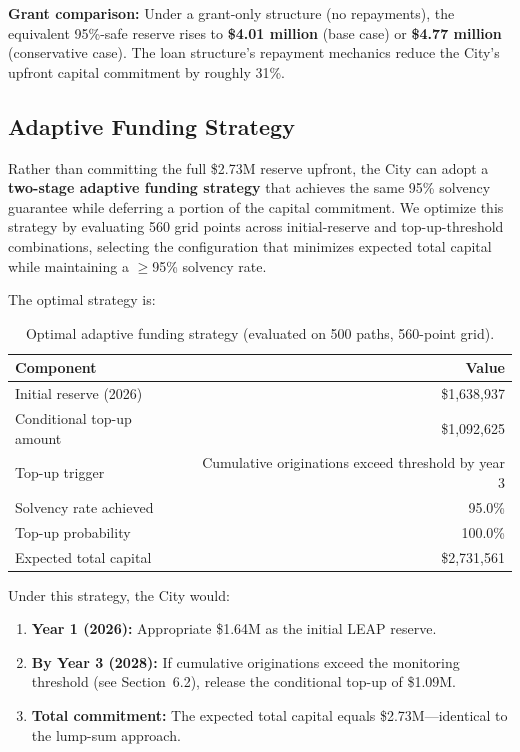 \documentclass[11pt, letterpaper]{article}
\begin{document}
\textbf{Grant comparison:} Under a grant-only structure (no repayments), the equivalent 95\%-safe reserve rises to \textbf{\$4.01 million} (base case) or \textbf{\$4.77 million} (conservative case). The loan structure's repayment mechanics reduce the City's upfront capital commitment by roughly 31\%.

\subsection{Adaptive Funding Strategy}

Rather than committing the full \$2.73M reserve upfront, the City can adopt a \textbf{two-stage adaptive funding strategy} that achieves the same 95\% solvency guarantee while deferring a portion of the capital commitment. We optimize this strategy by evaluating 560 grid points across initial-reserve and top-up-threshold combinations, selecting the configuration that minimizes expected total capital while maintaining a $\geq$95\% solvency rate.

The optimal strategy is:

\begin{table}[H]
  \centering
  \caption{Optimal adaptive funding strategy (evaluated on 500 paths, 560-point grid).}
  \label{tab:adaptive}
  \begin{tabular}{@{}lr@{}}
    \toprule
    \textbf{Component} & \textbf{Value} \\
    \midrule
    Initial reserve (2026) & \$1{,}638{,}937 \\
    Conditional top-up amount & \$1{,}092{,}625 \\
    Top-up trigger & Cumulative originations exceed threshold by year 3 \\
    Solvency rate achieved & 95.0\% \\
    Top-up probability & 100.0\% \\
    Expected total capital & \$2{,}731{,}561 \\
    \bottomrule
  \end{tabular}
\end{table}

Under this strategy, the City would:
\begin{enumerate}[nosep]
  \item \textbf{Year 1 (2026):} Appropriate \$1.64M as the initial LEAP reserve.
  \item \textbf{By Year 3 (2028):} If cumulative originations exceed the monitoring threshold (see Section~6.2), release the conditional top-up of \$1.09M.
  \item \textbf{Total commitment:} The expected total capital equals \$2.73M---identical to the lump-sum approach.
\end{enumerate}
\end{document}
